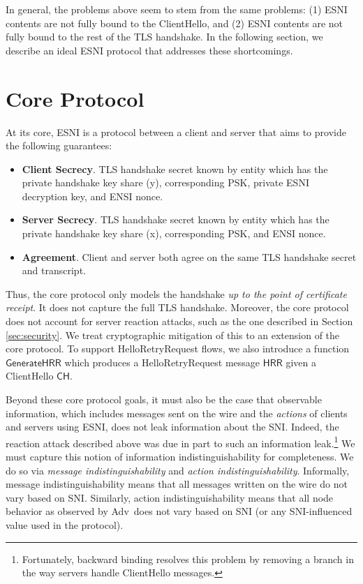 \documentclass{article}
\theoremstyle{definition}
\newcommand{\adv}{{\sf Adv}}
\theoremstyle{definition}
\begin{document}
In general, the problems above seem to stem from the same problems: (1) ESNI contents are not
fully bound to the ClientHello, and (2) ESNI contents are not fully bound to the rest of the TLS
handshake. In the following section, we describe an ideal ESNI protocol that addresses these
shortcomings.

\section{Core Protocol} \label{sec:core} %


At its core, ESNI is a protocol between a client and server that aims to provide the following guarantees:

%
\begin{itemize}
  \item {\bf Client Secrecy}. TLS handshake secret known by entity which has the private handshake key 
  share (y), corresponding PSK, private ESNI decryption key, and ENSI nonce. 
  \item {\bf Server Secrecy}. TLS handshake secret known by entity which has the private handshake key 
  share (x), corresponding PSK, and ENSI nonce.
  \item {\bf Agreement}. Client and server both agree on the same TLS handshake secret and transcript.
\end{itemize}
%

Thus, the core protocol only models the handshake \emph{up to the point of certificate receipt}. It does
not capture the full TLS handshake. Moreover, the core protocol does not account for server reaction
attacks, such as the one described in Section \ref{sec:security}. We treat cryptographic mitigation
of this to an extension of the core protocol. To support HelloRetryRequest flows, we also introduce a 
function $\mathsf{GenerateHRR}$ which produces a HelloRetryRequest message $\mathsf{HRR}$ given a 
ClientHello $\mathsf{CH}$.

Beyond these core protocol goals, it must also be the case that observable information, which includes 
messages sent on the wire and the \emph{actions} of clients and servers using ESNI, does not leak information
about the SNI. Indeed, the reaction attack described above was due in part to such an information 
leak.\footnote{Fortunately, backward binding resolves this problem by removing a branch in the way servers
handle ClientHello messages.} We must capture this notion of information indistinguishability for completeness.
We do so via \emph{message indistinguishability} and \emph{action indistinguishability}. Informally, message 
indistinguishability means that all messages written on the wire do not vary based on SNI. Similarly, action
indistinguishability means that all node behavior as observed by \adv\ does not vary based on SNI (or any SNI-influenced
value used in the protocol). 
\end{document}
